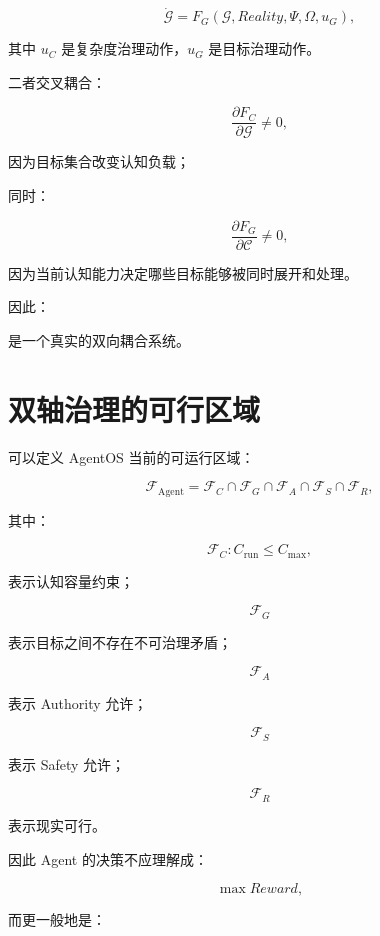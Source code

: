 \[
\dot{\mathcal G}
=
F_G(
\mathcal G,
Reality,
\Psi,
\Omega,
u_G
),
\]

其中 $u_C$ 是复杂度治理动作，$u_G$ 是目标治理动作。

二者交叉耦合：

\[
\frac{\partial F_C}{\partial \mathcal G}
\neq0,
\]

因为目标集合改变认知负载；

同时：

\[
\frac{\partial F_G}{\partial \mathcal C}
\neq0,
\]

因为当前认知能力决定哪些目标能够被同时展开和处理。

因此：

\begin{statementbox}
\centering
{}
\end{statementbox}

是一个真实的双向耦合系统。


\section{双轴治理的可行区域}

可以定义 AgentOS 当前的可运行区域：

\[
\boxed{
\mathcal F_{\mathrm{Agent}}
=
\mathcal F_C
\cap
\mathcal F_G
\cap
\mathcal F_A
\cap
\mathcal F_S
\cap
\mathcal F_R,
}
\]

其中：

\[
\mathcal F_C:
C_{\mathrm{run}}
\le
C_{\max},
\]

表示认知容量约束；

\[
\mathcal F_G
\]

表示目标之间不存在不可治理矛盾；

\[
\mathcal F_A
\]

表示 Authority 允许；

\[
\mathcal F_S
\]

表示 Safety 允许；

\[
\mathcal F_R
\]

表示现实可行。

因此 Agent 的决策不应理解成：

\[
\max Reward,
\]

而更一般地是：

\begin{statementbox}
\centering
{}
\end{statementbox}

